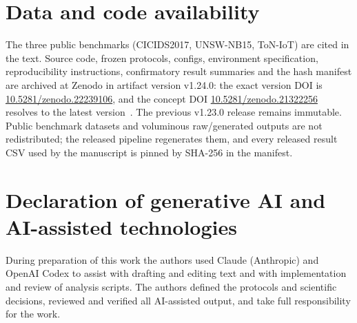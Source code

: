 \documentclass[a4paper,fleqn]{cas-sc}
\begin{document}
\section*{Data and code availability}
The three public benchmarks (CICIDS2017, UNSW-NB15, ToN-IoT) are cited in the text. Source code, frozen protocols, configs, environment specification, reproducibility instructions, confirmatory result summaries and the hash manifest are archived at Zenodo in artifact version v1.24.0: the exact version DOI is \href{https://doi.org/10.5281/zenodo.22239106}{10.5281/zenodo.22239106}, and the concept DOI \href{https://doi.org/10.5281/zenodo.21322256}{10.5281/zenodo.21322256} resolves to the latest version~\cite{fernandezbarrios2026artifact}. The previous v1.23.0 release remains immutable. Public benchmark datasets and voluminous raw/generated outputs are not redistributed; the released pipeline regenerates them, and every released result CSV used by the manuscript is pinned by SHA-256 in the manifest.

\section*{Declaration of generative AI and AI-assisted technologies}
During preparation of this work the authors used Claude (Anthropic) and OpenAI Codex to assist with drafting and editing text and with implementation and review of analysis scripts. The authors defined the protocols and scientific decisions, reviewed and verified all AI-assisted output, and take full responsibility for the work.

\printcredits


\end{document}
